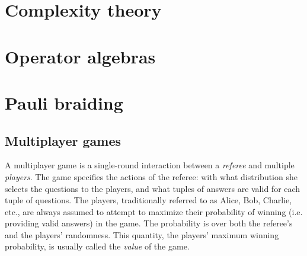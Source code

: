 \documentclass{book}
\theoremstyle{plain}
\theoremstyle{definition}
\theoremstyle{remark}
\numberwithin{equation}{subsection}
\begin{document}
\chapter{Complexity theory}



\label{section-phantom}










\chapter{Operator algebras}



\label{section-phantom}










\chapter{Pauli braiding}



\label{section-phantom}




\section{Multiplayer games}
\label{section:multigames}


A multiplayer game is a single-round interaction between a \emph{referee} and multiple \emph{players}. The game specifies the actions of the referee: with what distribution she selects the questions to the players, and what tuples of answers are valid for each tuple of questions. The players, traditionally referred to as Alice, Bob, Charlie, etc., are always assumed to attempt to maximize their probability of winning (i.e. providing valid answers) in the game. The probability is over both the referee's and the players' randomness. This quantity, the players' maximum winning probability, is usually called the \emph{value} of the game.
\end{document}
